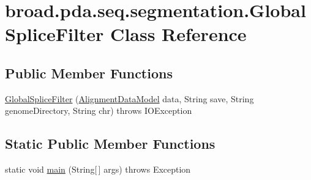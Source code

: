 \hypertarget{classbroad_1_1pda_1_1seq_1_1segmentation_1_1_global_splice_filter}{\section{broad.\+pda.\+seq.\+segmentation.\+Global\+Splice\+Filter Class Reference}
\label{classbroad_1_1pda_1_1seq_1_1segmentation_1_1_global_splice_filter}
}
\subsection*{Public Member Functions}
\begin{DoxyCompactItemize}
\item 
\hyperlink{classbroad_1_1pda_1_1seq_1_1segmentation_1_1_global_splice_filter_a1b27b404efa3b13591e3bc5c801b5865}{Global\+Splice\+Filter} (\hyperlink{interfacebroad_1_1pda_1_1seq_1_1segmentation_1_1_alignment_data_model}{Alignment\+Data\+Model} data, String save, String genome\+Directory, String chr)  throws I\+O\+Exception
\end{DoxyCompactItemize}
\subsection*{Static Public Member Functions}
\begin{DoxyCompactItemize}
\item 
static void \hyperlink{classbroad_1_1pda_1_1seq_1_1segmentation_1_1_global_splice_filter_a516f3c28151819cf9889ed3f6799e2ad}{main} (String\mbox{[}$\,$\mbox{]} args)  throws Exception
\end{DoxyCompactItemize}


